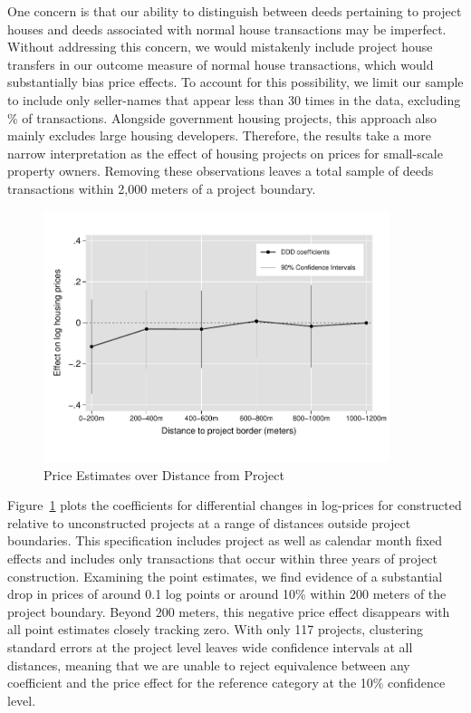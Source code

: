 \documentclass[12pt]{article}
\begin{document}
One concern is that our ability to distinguish between deeds pertaining to project houses and deeds associated with normal house transactions may be imperfect.  Without addressing this concern, we would mistakenly include project house transfers in our outcome measure of normal house transactions, which would substantially bias price effects.  To account for this possibility, we limit our sample to include only seller-names that appear less than 30 times in the data, excluding \unskip\% of transactions.  Alongside government housing projects, this approach also mainly excludes large housing developers.  Therefore, the results take a more narrow interpretation as the effect of housing projects on prices for small-scale property owners.  Removing these observations leaves a total sample of deeds transactions within 2,000 meters of a project boundary.  %

\begin{figure}
\caption{Price Estimates over Distance from Project}\label{figure:distplot}
\centering
\includegraphics[width=0.9\textwidth,trim={0cm .7cm 0cm 0.7cm},clip=true]{figures/price_regs_DDDplot}
\vspace{-2mm}
\end{figure}

Figure~\ref{figure:distplot} plots the coefficients for differential changes in log-prices for constructed relative to unconstructed projects at a range of distances outside project boundaries.  This specification includes project as well as calendar month fixed effects and includes only transactions that occur within three years of project construction.  Examining the point estimates, we find evidence of a substantial drop in prices of around 0.1 log points or around 10\% within 200 meters of the project boundary.  Beyond 200 meters, this negative price effect disappears with all point estimates closely tracking zero.  With only 117 projects, clustering standard errors at the project level leaves wide confidence intervals at all distances, meaning that we are unable to reject equivalence between any coefficient and the price effect for the reference category at the 10\% confidence level.
\end{document}
